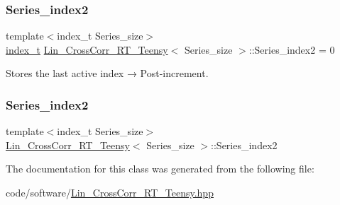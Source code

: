 \subsubsection{\texorpdfstring{Series\+\_\+index2}{Series\_index2}\hspace{0.1cm}{\footnotesize\ttfamily [1/2]}}
{\footnotesize\ttfamily template$<$index\+\_\+t Series\+\_\+size$>$ \\
\hyperlink{types_8hpp_a7c40bb931c31595ed6308605f4537447}{index\+\_\+t} \hyperlink{classLin__CrossCorr__RT__Teensy}{Lin\+\_\+\+Cross\+Corr\+\_\+\+R\+T\+\_\+\+Teensy}$<$ Series\+\_\+size $>$\+::Series\+\_\+index2 = 0}



Stores the last active index → Post-\/increment. 

\mbox{\label{classLin__CrossCorr__RT__Teensy_a4f84a456a7d6e90e8676e4c5ed059776}} 
\subsubsection{\texorpdfstring{Series\+\_\+index2}{Series\_index2}\hspace{0.1cm}{\footnotesize\ttfamily [2/2]}}
{\footnotesize\ttfamily template$<$index\+\_\+t Series\+\_\+size$>$ \\
\hyperlink{classLin__CrossCorr__RT__Teensy}{Lin\+\_\+\+Cross\+Corr\+\_\+\+R\+T\+\_\+\+Teensy}$<$ Series\+\_\+size $>$\+::Series\+\_\+index2}



The documentation for this class was generated from the following file\+:\begin{DoxyCompactItemize}
\item 
code/software/\hyperlink{Lin__CrossCorr__RT__Teensy_8hpp}{Lin\+\_\+\+Cross\+Corr\+\_\+\+R\+T\+\_\+\+Teensy.\+hpp}\end{DoxyCompactItemize}
